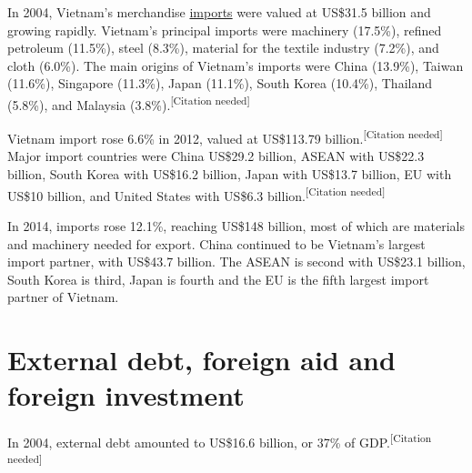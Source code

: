 \documentclass[openany]{book}
\begin{document}
In 2004, Vietnam's merchandise \href{https://en.wikipedia.org/wiki/Import}{imports} were valued at US\$31.5 billion and growing rapidly. Vietnam's principal imports were machinery (17.5\%), refined petroleum (11.5\%), steel (8.3\%), material for the textile industry (7.2\%), and cloth (6.0\%). The main origins of Vietnam's imports were China (13.9\%), Taiwan (11.6\%), Singapore (11.3\%), Japan (11.1\%), South Korea (10.4\%), Thailand (5.8\%), and Malaysia (3.8\%).\textsuperscript{[Citation needed]}

Vietnam import rose 6.6\% in 2012, valued at US\$113.79 billion.\textsuperscript{[Citation needed]} Major import countries were China US\$29.2 billion, ASEAN with US\$22.3 billion, South Korea with US\$16.2 billion, Japan with US\$13.7 billion, EU with US\$10 billion, and United States with US\$6.3 billion.\textsuperscript{[Citation needed]}

In 2014, imports rose 12.1\%, reaching US\$148 billion, most of which are materials and machinery needed for export. China continued to be Vietnam's largest import partner, with US\$43.7 billion. The ASEAN is second with US\$23.1 billion, South Korea is third, Japan is fourth and the EU is the fifth largest import partner of Vietnam.

\section{External debt, foreign aid and foreign investment}

In 2004, external debt amounted to US\$16.6 billion, or 37\% of GDP.\textsuperscript{[Citation needed]}
\end{document}

